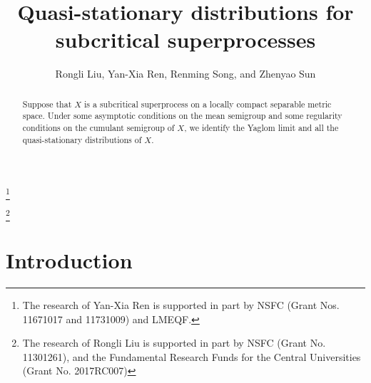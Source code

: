 \documentclass[12pt,a4paper]{amsart}
\numberwithin{equation}{section}
\theoremstyle{plain}
\theoremstyle{definition}
\theoremstyle{remark}
\begin{document}
\title{Quasi-stationary distributions for subcritical superprocesses}
\author[R. Liu, Y.-X. Ren, R. Song, and Z. Sun]{Rongli Liu, Yan-Xia Ren, Renming Song, and Zhenyao Sun}
\address{Yan-Xia Ren\\ LMAM School of Mathematical Sciences \& Center for
Statistical Science\\ Peking University\\ Beijing 100871\\ P. R. China}
\thanks{The research of Yan-Xia Ren is supported in part by NSFC (Grant Nos. 11671017 and 11731009)  and LMEQF.}
\address{Rongli Liu\\ Mathematics and Applied Mathematics\\ Beijing jiaotong University\\ Beijing 100044\\ P. R. China}
\thanks{The research of Rongli Liu is supported in part by NSFC (Grant No. 11301261), and the Fundamental Research Funds for the Central Universities (Grant No.  2017RC007)}
\address{Renming Song\\ Department of Mathematics\\ University of Illinois at Urbana-Champaign \\ Urbana \\ IL 61801\\ USA}
\address{Zhenyao Sun\\ Faculty of Industrial Engineering and Management \\ Technion, Isreal Institute of Technology \\ Haifa 3200003\\ Isreal}
\begin{abstract}
	Suppose that $X$ is a subcritical superprocess on a locally compact separable metric space. 
	Under some asymptotic conditions on the mean semigroup and some regularity conditions on the cumulant semigroup of $X$, we identify the Yaglom limit and all the quasi-stationary distributions of $X$.
\end{abstract}
\maketitle
\section{Introduction}
\end{document}
